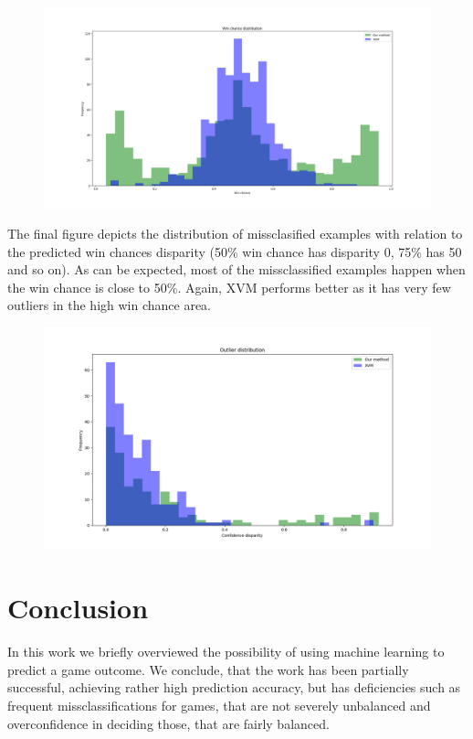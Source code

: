 \documentclass{report}
\begin{document}
\begin{figure}[H]
\hspace{-80pt}
  \includegraphics[width=500px]{winchance_distribution.png}
  \label{fig:distribution}
\end{figure}

The final figure depicts the distribution of missclasified examples with relation to the predicted win chances disparity (50\% win chance has disparity 0, 75\% has 50 and so on). As can be expected, most of the missclassified examples happen when the win chance is close to 50\%. Again, XVM performs better as it has very few outliers in the high win chance area.

\begin{figure}[H]
\hspace{-80pt}
  \includegraphics[width=500px]{outliers.png}
  \label{fig:outliers}
\end{figure}

\section{Conclusion}

In this work we briefly overviewed the possibility of using machine learning to predict a game outcome. We conclude, that the work has been partially successful, achieving rather high prediction accuracy, but has deficiencies such as frequent missclassifications for games, that are not severely unbalanced and overconfidence in deciding those, that are fairly balanced.
\end{document}
